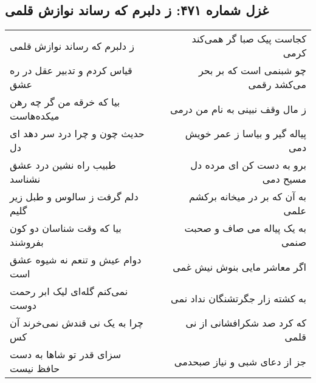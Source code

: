 \begin{center}
\section*{غزل شماره ۴۷۱: ز دلبرم که رساند نوازش قلمی}
\label{sec:sh471}
\begin{longtable}{l p{0.5cm} r}
ز دلبرم که رساند نوازش قلمی
&&
کجاست پیک صبا گر همی‌کند کرمی
\\
قیاس کردم و تدبیر عقل در ره عشق
&&
چو شبنمی است که بر بحر می‌کشد رقمی
\\
بیا که خرقه من گر چه رهن میکده‌هاست
&&
ز مال وقف نبینی به نام من درمی
\\
حدیث چون و چرا درد سر دهد ای دل
&&
پیاله گیر و بیاسا ز عمر خویش دمی
\\
طبیب راه نشین درد عشق نشناسد
&&
برو به دست کن ای مرده دل مسیح دمی
\\
دلم گرفت ز سالوس و طبل زیر گلیم
&&
به آن که بر در میخانه برکشم علمی
\\
بیا که وقت شناسان دو کون بفروشند
&&
به یک پیاله می صاف و صحبت صنمی
\\
دوام عیش و تنعم نه شیوه عشق است
&&
اگر معاشر مایی بنوش نیش غمی
\\
نمی‌کنم گله‌ای لیک ابر رحمت دوست
&&
به کشته زار جگرتشنگان نداد نمی
\\
چرا به یک نی قندش نمی‌خرند آن کس
&&
که کرد صد شکرافشانی از نی قلمی
\\
سزای قدر تو شاها به دست حافظ نیست
&&
جز از دعای شبی و نیاز صبحدمی
\\
\end{longtable}
\end{center}

